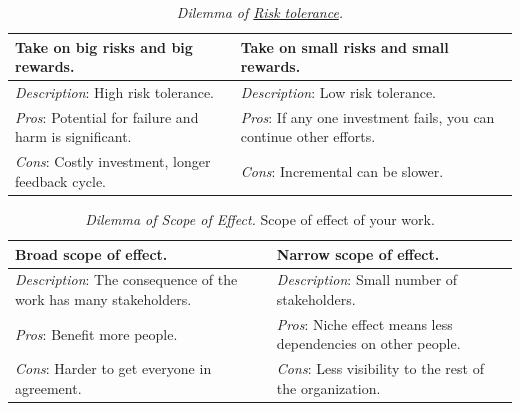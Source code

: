\begin{center}
\begin{table}[H] %
\begin{tabular}{ | m{\dilemmatablewidth}| m{\dilemmatablewidth} | } 
  \hline
  \textbf{Take on big risks and big rewards.} & 
  \textbf{Take on small risks and small rewards.} \\ 
  \hline
  \textit{Description}: High risk tolerance. &
  \textit{Description}: Low risk tolerance. \\
  \hline
  \textit{Pros}: Potential for failure and harm is significant. &
  \textit{Pros}: If any one investment fails, you can continue other efforts. \\
  \hline
  \textit{Cons}: Costly investment, longer feedback cycle. & 
  \textit{Cons}: Incremental can be slower. \\
  \hline
\end{tabular}
\caption{
\textit{Dilemma of \href{https://en.wikipedia.org/wiki/Risk_assessment}{Risk tolerance}.
} 
}
\label{table:risk}
\end{table}
\end{center}



\begin{center}
\begin{table}[H] %
\begin{tabular}{ | m{\dilemmatablewidth}| m{\dilemmatablewidth} | } 
  \hline
  \textbf{Broad scope of effect.} &
  \textbf{Narrow scope of effect.} \\
  \hline
  \textit{Description}: The consequence of the work has many stakeholders. &
  \textit{Description}: Small number of stakeholders. \\  
  \hline
  \textit{Pros}: Benefit more people. &
  \textit{Pros}: Niche effect means less dependencies on other people. \\
  \hline
  \textit{Cons}: Harder to get everyone in agreement. & 
  \textit{Cons}: Less visibility to the rest of the organization. \\
  \hline
\end{tabular}
\caption{
\textit{Dilemma of Scope of Effect.}
Scope of effect of your work. 
}
\end{table}
\label{table:scope-broad-vs-narrow}
\end{center}

